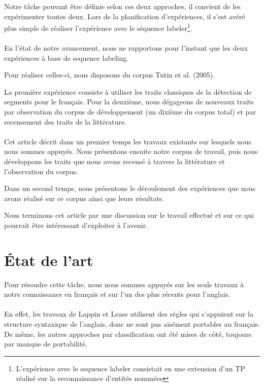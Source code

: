 \documentclass[a4paper,12pt]{article}
\begin{document}
Notre tâche pouvant être définie selon ces deux approches, il convient de les expérimenter toutes deux. Lors de la planification d'expériences, il s'est avéré plus simple de réaliser l'expérience avec le séquence labeler\footnote{L'expérience avec le sequence labeler consistait en une extension d'un TP réalisé sur la reconnaissance d'entités nommées}.

\paragraph{}
En l'état de notre avancement, nous ne rapportons pour l'instant que les deux expériences à base de sequence labeling.

Pour réaliser celles-ci, nous disposons du corpus Tutin et al.\cite{tutin:hal-00373327} (2005). 

La première expérience consiste à utiliser les traits classiques de la détection de segments pour le français. Pour la deuxième, nous dégageons de nouveaux traits par observation du corpus de développement (un dixième du corpus total) et par recensement des traits de la littérature.

\paragraph{}
Cet article décrit dans un premier temps les travaux existants sur lesquels nous nous sommes appuyés. Nous présentons ensuite notre corpus de travail, puis nous développons les traits que nous avons recensé à travers la littérature et l'observation du corpus.

Dans un second temps, nous présentons le déroulement des expériences que nous avons réalisé sur ce corpus ainsi que leurs résultats.

Nous terminons cet article par une discussion sur le travail effectué et sur ce qui pourrait être intéressant d'exploiter à l'avenir.


\section{État de l'art}

Pour résoudre cette tâche, nous nous sommes appuyés sur les seuls travaux à notre connaissance en français et sur l'un des plus récents pour l'anglais.

\paragraph{}
En effet, les travaux de Lappin et Leass utilisent des règles qui s'appuient sur la structure syntaxique de l'anglais, donc ne sont pas aisément portables au français. De même, les autres approches par classification ont été mises de côté, toujours par manque de portabilité.
\end{document}
